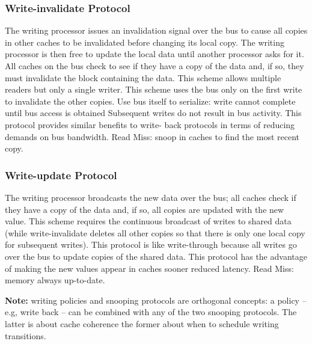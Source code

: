 \subsubsection{Write-invalidate Protocol}
The writing processor issues an invalidation signal
over the bus to cause all copies in other caches to
be invalidated before changing its local copy.
The writing processor is then free to update the
local data until another processor asks for it.
All caches on the bus check to see if they have a
copy of the data and, if so, they must invalidate the
block containing the data.
This scheme allows multiple readers but only a
single writer.
This scheme uses the bus only on the first write
to invalidate the other copies.
Use bus itself to serialize: write cannot complete until bus access is obtained
Subsequent writes do not result in bus activity.
This protocol provides similar benefits to write-
back protocols in terms of reducing demands
on bus bandwidth.
Read Miss: snoop in caches to find the most
recent copy.

\subsubsection{Write-update Protocol}
The writing processor broadcasts the new data over
the bus;
all caches check if they have a copy of the
data and, if so, all copies are updated with the new
value.
This scheme requires the continuous broadcast of
writes to shared data (while write-invalidate deletes
all other copies so that there is only one local copy
for subsequent writes).
This protocol is like write-through because all writes
go over the bus to update copies of the shared
data.
This protocol has the advantage of making the new
values appear in caches sooner \textrightarrow reduced latency.
Read Miss: memory always up-to-date.

\textbf{Note:} writing policies and snooping protocols are orthogonal concepts: a policy -- e.g, write back --
can be combined with any of the two snooping protocols.
The latter is about cache coherence the former about when to schedule writing transitions.

